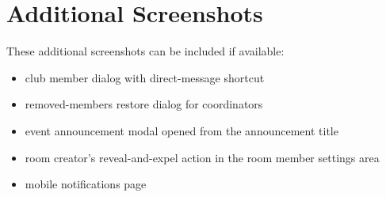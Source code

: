 \documentclass[11pt,a4paper]{article}
\begin{document}
\section{Additional Screenshots}

These additional screenshots can be included if available:

\begin{itemize}[leftmargin=1.5em]
  \item club member dialog with direct-message shortcut
  \item removed-members restore dialog for coordinators
  \item event announcement modal opened from the announcement title
  \item room creator's reveal-and-expel action in the room member settings area
  \item mobile notifications page
\end{itemize}
\end{document}
